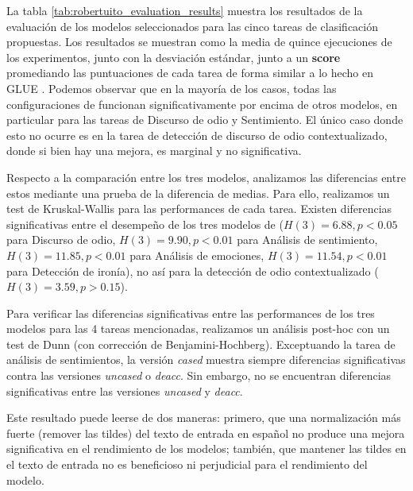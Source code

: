 La tabla \ref{tab:robertuito_evaluation_results} muestra los resultados de la evaluación de los modelos seleccionados para las cinco tareas de clasificación propuestas. Los resultados se muestran como la media de quince ejecuciones de los experimentos, junto con la desviación estándar, junto a un \textbf{score} promediando las puntuaciones de cada tarea de forma similar a lo hecho en GLUE \cite{wang-etal-2018-glue}. Podemos observar que en la mayoría de los casos, todas las configuraciones de \robertuito{} funcionan significativamente por encima de otros modelos, en particular para las tareas de Discurso de odio y Sentimiento. El único caso donde esto no ocurre es en la tarea de detección de discurso de odio contextualizado, donde si bien hay una mejora, es marginal y no significativa.

Respecto a la comparación entre los tres modelos, analizamos las diferencias entre estos mediante una prueba de la diferencia de medias. Para ello, realizamos un test de Kruskal-Wallis \cite{kruskal1952use} para las performances de cada tarea. Existen diferencias significativas entre el desempeño de los tres modelos de \robertuito{} ($ H (3) = 6.88, p < 0.05 $ para Discurso de odio, $ H (3) = 9.90 , p < 0.01 $ para Análisis de sentimiento, $ H (3) = 11.85, p <0.01 $ para Análisis de emociones, $ H (3) = 11.54, p <0.01 $ para Detección de ironía), no así para la detección de odio contextualizado ($H(3)=3.59, p > 0.15$).

Para verificar las diferencias significativas entre las performances de los tres modelos para las 4 tareas mencionadas, realizamos un análisis post-hoc con un test de Dunn (con corrección de Benjamini-Hochberg).  Exceptuando la tarea de análisis de sentimientos, la versión \emph{cased} muestra siempre diferencias significativas contra las versiones \emph{uncased} o \emph{deacc}. Sin embargo, no se encuentran diferencias significativas entre las versiones \emph{uncased} y \emph{deacc}.

Este resultado puede leerse de dos maneras: primero, que una normalización más fuerte (remover las tildes) del texto de entrada en español no produce una mejora significativa en el rendimiento de los modelos; también, que mantener las tildes en el texto de entrada no es beneficioso ni perjudicial para el rendimiento del modelo.


